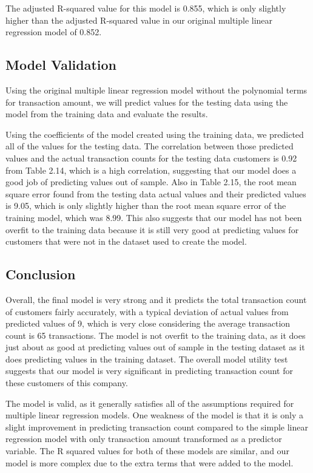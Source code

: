 \documentclass[
]{article}
\begin{document}
The adjusted R-squared value for this model is 0.855, which is only
slightly higher than the adjusted R-squared value in our original
multiple linear regression model of 0.852.

\hypertarget{model-validation-1}{%
\subsection{Model Validation}\label{model-validation-1}}

Using the original multiple linear regression model without the
polynomial terms for transaction amount, we will predict values for the
testing data using the model from the training data and evaluate the
results.

Using the coefficients of the model created using the training data, we
predicted all of the values for the testing data. The correlation
between those predicted values and the actual transaction counts for the
testing data customers is 0.92 from Table 2.14, which is a high
correlation, suggesting that our model does a good job of predicting
values out of sample. Also in Table 2.15, the root mean square error
found from the testing data actual values and their predicted values is
9.05, which is only slightly higher than the root mean square error of
the training model, which was 8.99. This also suggests that our model
has not been overfit to the training data because it is still very good
at predicting values for customers that were not in the dataset used to
create the model.

\hypertarget{conclusion-1}{%
\subsection{Conclusion}\label{conclusion-1}}

Overall, the final model is very strong and it predicts the total
transaction count of customers fairly accurately, with a typical
deviation of actual values from predicted values of 9, which is very
close considering the average transaction count is 65 transactions. The
model is not overfit to the training data, as it does just about as good
at predicting values out of sample in the testing dataset as it does
predicting values in the training dataset. The overall model utility
test suggests that our model is very significant in predicting
transaction count for these customers of this company.

The model is valid, as it generally satisfies all of the assumptions
required for multiple linear regression models. One weakness of the
model is that it is only a slight improvement in predicting transaction
count compared to the simple linear regression model with only
transaction amount transformed as a predictor variable. The R squared
values for both of these models are similar, and our model is more
complex due to the extra terms that were added to the model.
\end{document}
